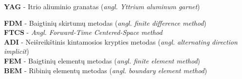 
\textbf{YAG} - Itrio aliuminio granatas (\textit{angl. Yttrium aluminum garnet}) 

\textbf{FDM} - Baigtinių skirtumų metodas (\textit{angl. finite difference method}) \\

\textbf{FTCS} - \textit{Angl. Forward-Time Centered-Space method} \\

\textbf{ADI} - Neišreikštinis kintamosios krypties metodas (\textit{angl. alternating direction implicit}) \\

\textbf{FEM} - Baigtinių elementų metodas (\textit{angl. finite element method}) \\

\textbf{BEM} - Ribinių elementų metodas (\textit{angl. boundary element method}) \\

\newpage %
